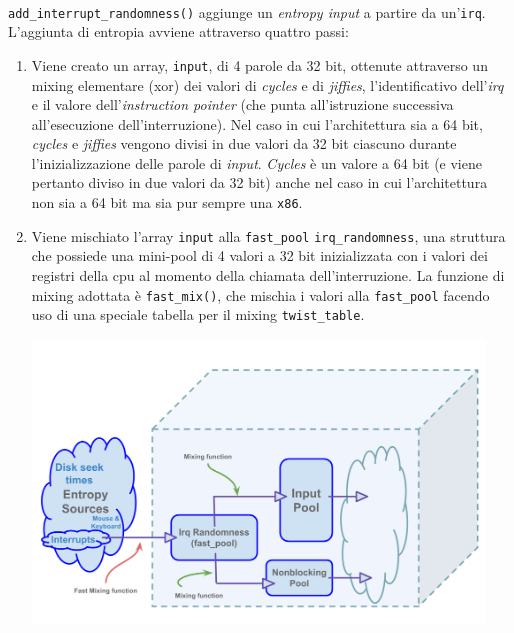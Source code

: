 \documentclass{article}
\begin{document}
 \paragraph{} \verb+add_interrupt_randomness()+ aggiunge un
 \emph{entropy input} a partire da un'\verb+irq+. 
 L'aggiunta di entropia avviene attraverso quattro passi:
 \begin{enumerate}
   \item Viene creato un array, \verb+input+, di 4 parole da 32 bit, ottenute
   attraverso un mixing elementare (xor) dei valori di \emph{cycles} e di \emph{jiffies},
   l'identificativo dell'\emph{irq} e il valore dell'\emph{instruction pointer}
   (che punta all'istruzione successiva all'esecuzione dell'interruzione). Nel
   caso in cui l'architettura sia a 64 bit, \emph{cycles} e
   \emph{jiffies} vengono divisi in due valori da 32 bit ciascuno durante
   l'inizializzazione delle parole di \emph{input}. \emph{Cycles} è un valore a
   64 bit (e viene pertanto diviso in due valori da 32 bit) anche nel caso in
   cui l'architettura non sia a 64 bit ma sia pur sempre una \verb+x86+.
   \item Viene mischiato l'array \verb+input+ alla
   \verb+fast_pool+ \verb+irq_randomness+, una
   struttura che possiede una mini-pool di 4 valori a 32 bit inizializzata con i
   valori dei registri della cpu al momento della chiamata dell'interruzione. 
   La funzione di mixing adottata è \verb+fast_mix()+, che mischia i valori alla
   \verb+fast_pool+ facendo uso di una speciale tabella per il mixing
   \verb+twist_table+.\\
       \centerline{\includegraphics[width=120mm]{img/fast_pool.png}} 
   

\end{enumerate}
\end{document}
